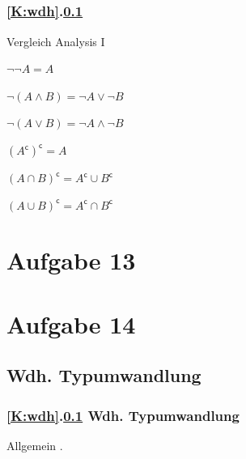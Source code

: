 \documentclass[9pt,german]{beamer}%
\begin{document}
\subsection{\stitle}\label{S:Morgansche}
\begin{frame}[fragile]%
  \frametitle{\ref{K:wdh}.\ref{S:Morgansche} \stitle}%
Vergleich Analysis I
\medskip

\begin{description}
  \item[und bzw. oder]
  \item $\neg \neg A = A$
  \item $\neg (A \wedge B) = \neg A \vee \neg B$
  \item $\neg (A \vee B) = \neg A \wedge \neg B$
\end{description}
\medskip

\begin{description}
  \item[Schnittmenge bzw. Vereinigung]
  \item $(A^{\mathsf{c}})^{\mathsf{c}} = A$
  \item $(A \cap B)^{\mathsf{c}} = A^{\mathsf{c}} \cup B^{\mathsf{c}}$
  \item $(A \cup B)^{\mathsf{c}} = A^{\mathsf{c}} \cap B^{\mathsf{c}}$
\end{description}

\end{frame}

\section{Aufgabe 13}

\section{Aufgabe 14}

\def\stitle{Wdh. Typumwandlung}
\subsection{\stitle}\label{S:Typumwandlung}
\begin{frame}[fragile]%
  \frametitle{\ref{K:wdh}.\ref{S:Morgansche} \stitle}%
\medskip

Allgemein .


\end{frame}
\end{document}
